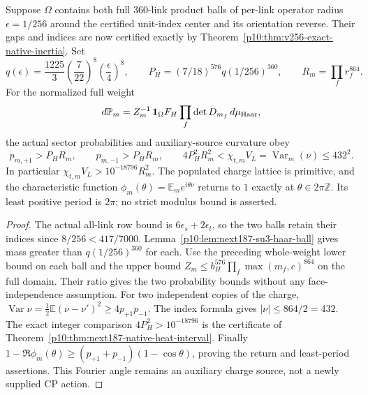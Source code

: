 \documentclass[12pt,a4paper]{article}
\begin{document}
\begin{corollary}
\label{p10:cor:v2189-massive-topological-interval}
Suppose $\Omega$ contains both full $360$-link product balls of per-link
operator radius $\epsilon=1/256$ around the certified unit-index center
and its orientation reverse. Their gaps and indices are now certified
exactly by Theorem~\ref{p10:thm:v256-exact-native-inertia}. Set
\[
 q(\epsilon)=\frac{1225}{3}\left(\frac7{22}\right)^8
                     \left(\frac\epsilon4\right)^8,\qquad
 P_H=(7/18)^{576}q(1/256)^{360},\qquad R_m=\prod_f r_f^{864}.
\]
For the normalized full weight
\[
 d\mathbb P_m=Z_m^{-1}\,\mathbf1_\Omega F_H
                    \prod_f\det D_{m_f}\,d\mu_{\rm Haar},
\]
the actual sector probabilities and auxiliary-source curvature obey
\[
 p_{m,+1}>P_HR_m,\qquad p_{m,-1}>P_HR_m,
 \qquad
 4P_H^2R_m^2<\chi_{t,m}V_L=\operatorname{Var}_m(\nu)\le432^2.
\]
In particular $\chi_{t,m}V_L>10^{-18796}R_m^2$.
The populated charge lattice is primitive, and the characteristic function
$\phi_m(\theta)=\mathbb E_me^{i\theta\nu}$ returns to $1$ exactly at
$\theta\in2\pi\mathbb Z$. Its least positive period is $2\pi$; no strict
modulus bound is asserted.
\end{corollary}
\begin{proof}
The actual all-link row bound is $6\epsilon_s+2\epsilon_t$, so the two
balls retain their indices since $8/256<417/7000$. Lemma~\ref{p10:lem:next187-su3-haar-ball} gives mass greater than $q(1/256)^{360}$ for each.
Use the preceding whole-weight lower bound on each ball and the upper
bound $Z_m\le b_H^{576}\prod_f\max(m_f,c)^{864}$ on the full domain.
Their ratio gives the two probability bounds without any face-independence
assumption. For two independent copies of the charge,
$\operatorname{Var}\nu=\frac12\mathbb E(\nu-\nu')^2\ge4p_{+1}p_{-1}$.
The index formula gives $|\nu|\le864/2=432$. The exact integer comparison $4P_H^2>10^{-18796}$ is the
certificate of Theorem~\ref{p10:thm:next187-native-heat-interval}. Finally
$1-\Re\phi_m(\theta)\ge(p_{+1}+p_{-1})(1-\cos\theta)$, proving the
return and least-period assertions. This Fourier angle remains an
auxiliary charge source, not a newly supplied CP action.
\end{proof}
\end{document}
